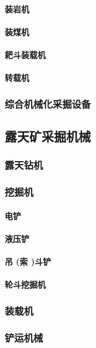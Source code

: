 \documentclass[UTF8]{../../ApplicationUniverse}
\begin{document}
            \paragraph{装岩机}
            \paragraph{装煤机}
            \paragraph{耙斗装载机}
            \paragraph{转载机}
        \subsubsection{综合机械化采掘设备}
    \subsection{露天矿采掘机械}
        \subsubsection{露天钻机}
        \subsubsection{挖掘机}
            \paragraph{电铲}
            \paragraph{液压铲}
            \paragraph{吊 (索 )斗铲}
            \paragraph{轮斗挖掘机}
        \subsubsection{装载机}
        \subsubsection{铲运机械}
\end{document}
